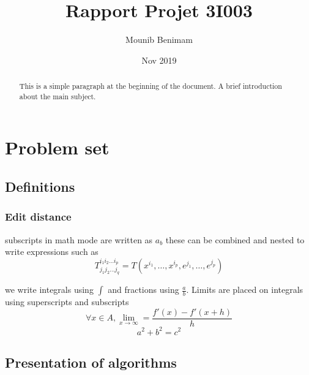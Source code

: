 \documentclass{report}
\title{Rapport Projet 3I003}
\author{Mounib Benimam}
\date{Nov 2019}
\begin{document}
\maketitle

\tableofcontents
\chapter{Problem set}
\begin{abstract}
    This is a simple paragraph at the beginning of the document.
    A brief introduction about the main subject. 
\end{abstract}
\newpage
\section{Definitions}
\subsection{Edit distance}
subscripts in math mode are written as $a_b$ these can be combined and nested to write expressions such as \[T^{i_1 i_2 \dots i_p}_{j_1 j_2 \dots j_q} = T(x^{i_1}, \dots ,x^{i_p}, e^{j_1}, \dots, e^{j_p}) \]

we write integrals using $\int$ and fractions using $\frac{a}{b}$. Limits are placed on integrals using superscripts and subscripts 
\[\forall x \in A , \lim_{x\to\infty} = \frac{f'(x) - f'(x+h)}{h}\]
\[a^2 + b^2 = c^2 \]
\newpage
\section{Presentation of algorithms}
\end{document}
